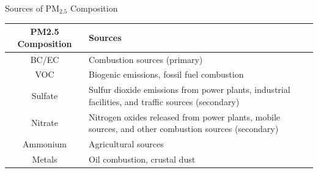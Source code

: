 \documentclass[handout]{beamer} %
\begin{document}
\begin{frame}{Sources of PM$_{2.5}$ Composition}
    \begin{table}
    \centering
    \begin{tabular}{|c|p{}|}
        \hline
        \textbf{PM2.5 Composition} & \textbf{Sources}  \\
        \hline
        BC/EC & Combustion sources (primary) \\
        \hline
        VOC & Biogenic emissions, fossil fuel combustion \\
        \hline
        Sulfate &  Sulfur dioxide emissions from power plants, industrial facilities, and traffic sources (secondary) \\
        \hline
        Nitrate & Nitrogen oxides released from power plants, mobile sources, and other combustion sources (secondary) \\
        \hline
        Ammonium & Agricultural sources \\
        \hline 
        Metals &  Oil combustion, crustal dust \\
        \hline
    \end{tabular}
\end{table}
\end{frame}
\end{document}
